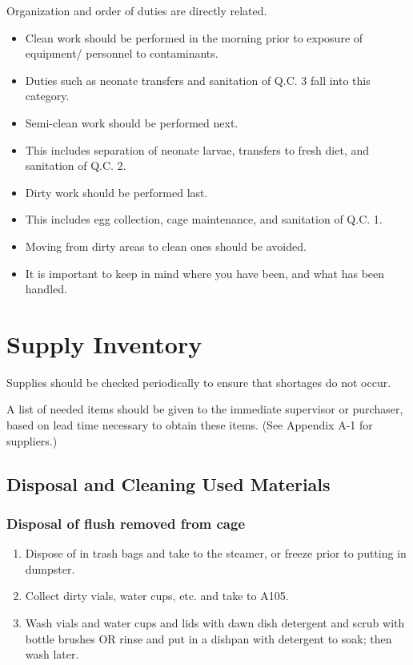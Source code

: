 \documentclass{sop_class}[overrideChapters] %
\begin{document}
{Organization and order of duties are directly related.
\begin{itemize}
\item
  Clean work should be performed in the morning prior to exposure of
  equipment/ personnel to contaminants.
\item
  Duties such as neonate transfers and sanitation of Q.C. 3 fall into
  this category.
\item
  Semi-clean work should be performed next.
\item
  This includes separation of neonate larvae, transfers to fresh diet,
  and sanitation of Q.C. 2.
\item
  Dirty work should be performed last.
\item
  This includes egg collection, cage maintenance, and sanitation of
  Q.C. 1.
\item
  Moving from dirty areas to clean ones should be avoided.
\item
  It is important to keep in mind where you have been, and what has
  been handled.
\end{itemize}
\hypertarget{supply-inventory}{%
\section{Supply Inventory}\label{supply-inventory}}

Supplies should be checked periodically to ensure that shortages do not
occur.

A list of needed items should be given to the immediate supervisor or
purchaser, based on lead time necessary to obtain these items. (See
Appendix A-1 for suppliers.)

\hypertarget{cleaning-used-mats}{%
\subsection{Disposal and Cleaning Used Materials}\label{cleaning-used-mats}}

\hypertarget{dispose-flush}{%
\subsubsection{Disposal of flush removed from cage}\label{dispose-flush}}
\begin{enumerate}
\def\labelenumi{\arabic{enumi}.}
\item
  Dispose of in trash bags and take to the steamer, or freeze prior to
  putting in dumpster.
\item
  Collect dirty vials, water cups, etc. and take to A105.
\item
  Wash vials and water cups and lids with dawn dish detergent and
  scrub with bottle brushes OR rinse and put in a dishpan with
  detergent to soak; then wash later.
\end{enumerate}
\hypertarget{dispose-water}{%
}}
\end{document}
